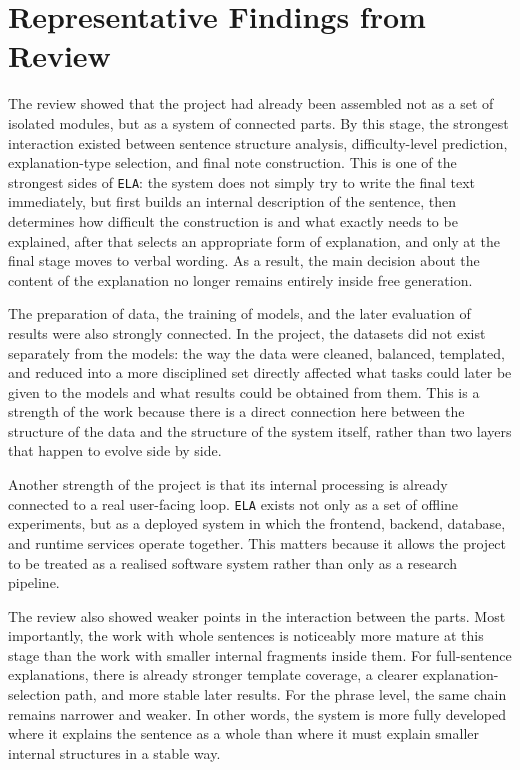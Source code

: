 \documentclass[12pt,a4paper,oneside]{report}
\begin{document}
\section{Representative Findings from Review}
The review showed that the project had already been assembled not as a set of isolated modules, but as a system of connected parts. By this stage, the strongest interaction existed between sentence structure analysis, difficulty-level prediction, explanation-type selection, and final note construction. This is one of the strongest sides of \texttt{ELA}: the system does not simply try to write the final text immediately, but first builds an internal description of the sentence, then determines how difficult the construction is and what exactly needs to be explained, after that selects an appropriate form of explanation, and only at the final stage moves to verbal wording. As a result, the main decision about the content of the explanation no longer remains entirely inside free generation.

The preparation of data, the training of models, and the later evaluation of results were also strongly connected. In the project, the datasets did not exist separately from the models: the way the data were cleaned, balanced, templated, and reduced into a more disciplined set directly affected what tasks could later be given to the models and what results could be obtained from them. This is a strength of the work because there is a direct connection here between the structure of the data and the structure of the system itself, rather than two layers that happen to evolve side by side.

Another strength of the project is that its internal processing is already connected to a real user-facing loop. \texttt{ELA} exists not only as a set of offline experiments, but as a deployed system in which the frontend, backend, database, and runtime services operate together. This matters because it allows the project to be treated as a realised software system rather than only as a research pipeline.

The review also showed weaker points in the interaction between the parts. Most importantly, the work with whole sentences is noticeably more mature at this stage than the work with smaller internal fragments inside them. For full-sentence explanations, there is already stronger template coverage, a clearer explanation-selection path, and more stable later results. For the phrase level, the same chain remains narrower and weaker. In other words, the system is more fully developed where it explains the sentence as a whole than where it must explain smaller internal structures in a stable way.
\end{document}
